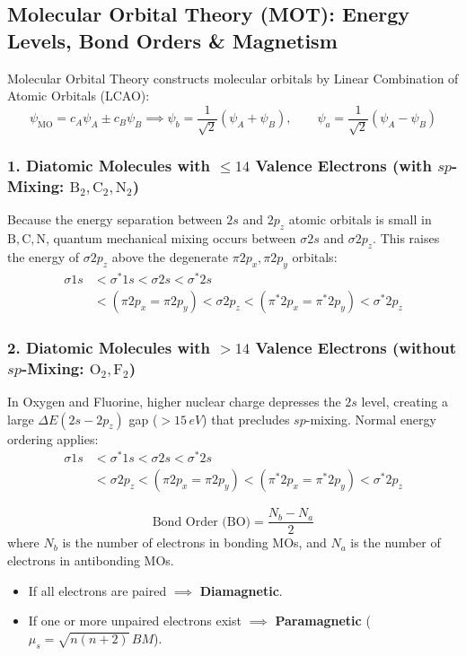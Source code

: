 \documentclass[10pt,twoside,openright]{book}
\begin{document}
\subsection{Molecular Orbital Theory (MOT): Energy Levels, Bond Orders \& Magnetism}
Molecular Orbital Theory constructs molecular orbitals by Linear Combination of Atomic Orbitals (LCAO):
\begin{equation}
  \psi_{\text{MO}} = c_A \psi_A \pm c_B \psi_B \implies \psi_b = \frac{1}{\sqrt{2}}(\psi_A + \psi_B), \qquad \psi_a = \frac{1}{\sqrt{2}}(\psi_A - \psi_B)
\end{equation}

\subsubsection{1. Diatomic Molecules with $\le 14$ Valence Electrons (with $sp$-Mixing: $\mathrm{B_2, C_2, N_2}$)}
Because the energy separation between $2s$ and $2p_z$ atomic orbitals is small in $\mathrm{B, C, N}$, quantum mechanical mixing occurs between $\sigma 2s$ and $\sigma 2p_z$. This raises the energy of $\sigma 2p_z$ above the degenerate $\pi 2p_x, \pi 2p_y$ orbitals:
\begin{align}
  \sigma 1s &< \sigma^* 1s < \sigma 2s < \sigma^* 2s \\
  &< (\pi 2p_x = \pi 2p_y) < \sigma 2p_z < (\pi^* 2p_x = \pi^* 2p_y) < \sigma^* 2p_z
\end{align}

\subsubsection{2. Diatomic Molecules with $> 14$ Valence Electrons (without $sp$-Mixing: $\mathrm{O_2, F_2}$)}
In Oxygen and Fluorine, higher nuclear charge depresses the $2s$ level, creating a large $\Delta E(2s-2p_z)$ gap ($> 15\,\si{eV}$) that precludes $sp$-mixing. Normal energy ordering applies:
\begin{align}
  \sigma 1s &< \sigma^* 1s < \sigma 2s < \sigma^* 2s \\
  &< \sigma 2p_z < (\pi 2p_x = \pi 2p_y) < (\pi^* 2p_x = \pi^* 2p_y) < \sigma^* 2p_z
\end{align}

\begin{formulabox}
\begin{equation}
  \text{Bond Order (BO)} = \frac{N_b - N_a}{2}
\end{equation}
where $N_b$ is the number of electrons in bonding MOs, and $N_a$ is the number of electrons in antibonding MOs.
\begin{itemize}
  \item If all electrons are paired $\implies$ \textbf{Diamagnetic}.
  \item If one or more unpaired electrons exist $\implies$ \textbf{Paramagnetic} ($\mu_s = \sqrt{n(n+2)}\,\si{BM}$).
\end{itemize}
\end{formulabox}
\end{document}

